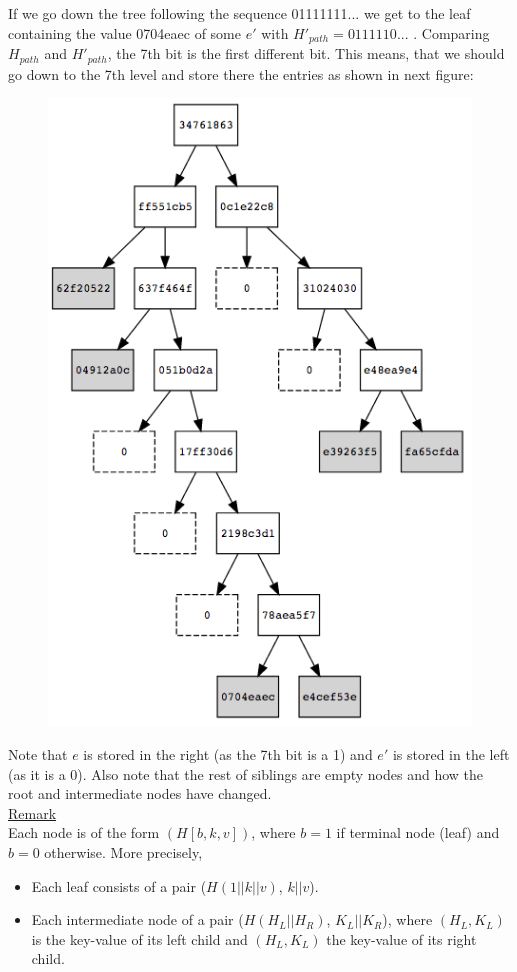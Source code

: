 \documentclass{article}
\begin{document}
\begin{spacing}{1.2}
If we go down the tree following the sequence 01111111... we get to the leaf containing the value 0704eaec of some $e'$ with $H'_{path}=0111110...$ . Comparing $H_{path}$ and $H'_{path}$, the 7th bit is the first different bit. This means, that we should go down to the 7th level and store there the entries as shown in next figure:

\begin{figure}[h]
	\centering
	\includegraphics[scale=0.5]{../../figures/ex-MT-6.png}
\end{figure}

Note that $e$ is stored in the right (as the 7th bit is a 1) and $e'$ is stored in the left (as it is a 0). Also note that the rest of siblings are empty nodes and how the root and intermediate nodes have changed.\\


{\underline{Remark}}\\

Each node is of the form $(H[b, k, v])$, where $b = 1$ if terminal node (leaf) and $b = 0$ otherwise. More precisely,
\begin{itemize} 
	\item Each leaf consists of a pair ($H(1 || k || v)$, $k||v$).
	\item Each intermediate node of a pair ($H(H_L||H_R)$, $K_L||K_R$), where $(H_L,K_L)$ is the key-value of its left child and $(H_L,K_L)$ the key-value of its right child.
\end{itemize}


\end{spacing}
\end{document}
